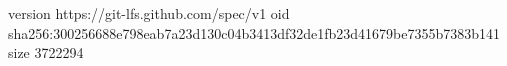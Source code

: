 version https://git-lfs.github.com/spec/v1
oid sha256:300256688e798eab7a23d130c04b3413df32de1fb23d41679be7355b7383b141
size 3722294
